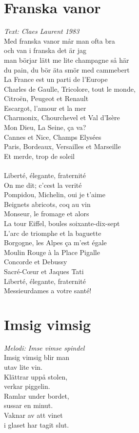 \section{Franska vanor}
\textit{Text: Claes Laurent 1983}
\vspace{2mm}\\
Med franska vanor mår man ofta bra\\
och van i franska det är jag\\
man börjar lätt me lite champagne så här\\
du pain, du bör äta smör med cammebert\\
La France est un parti de l'Europe\\
Charles de Gaulle, Tricolore, tout le monde,\\
Citroën, Peugeot et Renault\\
Escargot, l'amour et la mer\\
Charmonix, Chourchevel et Val d'Isère\\
Mon Dieu, La Seine, ça va?\\
Cannes et Nice, Champs Elysées\\
Paris, Bordeaux, Versailles et Marseille\\
Et merde, trop de soleil\\
\\
Liberté, élegante, fraternité\\
On me dit; c'cest la verité\\
Pompidou, Michelin, oui je t'aime\\
Beignets abricots, coq au vin\\
Monseur, le fromage et alors\\
La tour Eiffel, boules soixante-dix-sept\\
L'arc de triomphe et la baguette\\
Borgogne, les Alpes ça m'est égale\\
Moulin Rouge à la Place Pigalle\\
Concorde et Debussy\\
Sacré-C\oe{}ur et Jaques Tati\\
Liberté, élegante, fraternité\\
Messieurdames a votre santé!

\section{Imsig vimsig}
\textit{Melodi: Imse vimse spindel}
\vspace{2mm}\\
Imsig vimsig blir man\\
utav lite vin.\\
Klättrar uppå stolen,\\
verkar piggelin.\\
Ramlar under bordet,\\
sussar en minut.\\
Vaknar av att vinet\\
i glaset har tagit slut.

